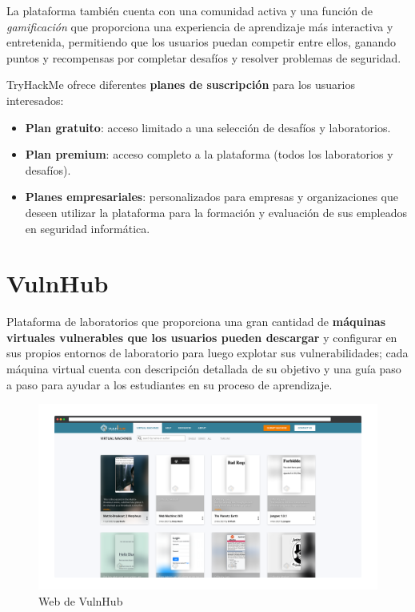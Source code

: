     La plataforma también cuenta con una comunidad activa y una función de \textit{gamificación} que proporciona una experiencia de aprendizaje más interactiva y entretenida, permitiendo que los usuarios puedan competir entre ellos, ganando puntos y recompensas por completar desafíos y resolver problemas de seguridad.
    
    TryHackMe ofrece diferentes \textbf{planes de suscripción} para los usuarios interesados:
    
    \begin{itemize}
        \item \textbf{Plan gratuito}: acceso limitado a una selección de desafíos y laboratorios.
    
        \item \textbf{Plan premium}: acceso completo a la plataforma (todos los laboratorios y desafíos).
    
        \item \textbf{Planes empresariales}: personalizados para empresas y organizaciones que deseen utilizar la plataforma para la formación y evaluación de sus empleados en seguridad informática.
    \end{itemize}
    
    \newpage
    
    
    \section{VulnHub}
    
    Plataforma de laboratorios que proporciona una gran cantidad de \textbf{máquinas virtuales vulnerables que los usuarios pueden descargar} y configurar en sus propios entornos de laboratorio para luego explotar sus vulnerabilidades; cada máquina virtual cuenta con descripción detallada de su objetivo y una guía paso a paso para ayudar a los estudiantes en su proceso de aprendizaje.
    
    \begin{figure}[h]
        \centering
        \includegraphics[width=\textwidth]{images/Capturas/Web de VulnHub.png}
        \caption{Web de VulnHub}
        \label{fig:VulnHub-web}
    \end{figure}
    
